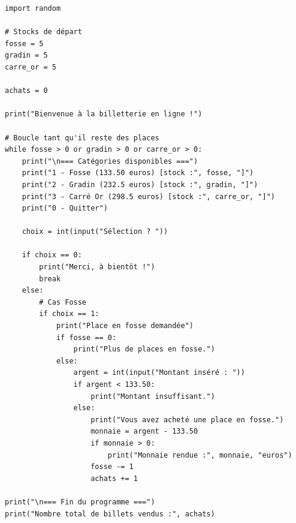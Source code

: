 \reponse{}

\begin{verbatim}
import random

# Stocks de départ
fosse = 5
gradin = 5
carre_or = 5

achats = 0

print("Bienvenue à la billetterie en ligne !")

# Boucle tant qu'il reste des places
while fosse > 0 or gradin > 0 or carre_or > 0:
    print("\n=== Catégories disponibles ===")
    print("1 - Fosse (133.50 euros) [stock :", fosse, "]")
    print("2 - Gradin (232.5 euros) [stock :", gradin, "]")
    print("3 - Carré Or (298.5 euros) [stock :", carre_or, "]")
    print("0 - Quitter")

    choix = int(input("Sélection ? "))

    if choix == 0:
        print("Merci, à bientôt !")
        break
    else:
        # Cas Fosse
        if choix == 1:
            print("Place en fosse demandée")
            if fosse == 0:
                print("Plus de places en fosse.")
            else:
                argent = int(input("Montant inséré : "))
                if argent < 133.50:
                    print("Montant insuffisant.")
                else:
                    print("Vous avez acheté une place en fosse.")
                    monnaie = argent - 133.50
                    if monnaie > 0:
                        print("Monnaie rendue :", monnaie, "euros")
                    fosse -= 1
                    achats += 1

print("\n=== Fin du programme ===")
print("Nombre total de billets vendus :", achats)
\end{verbatim}

\reponse{}

